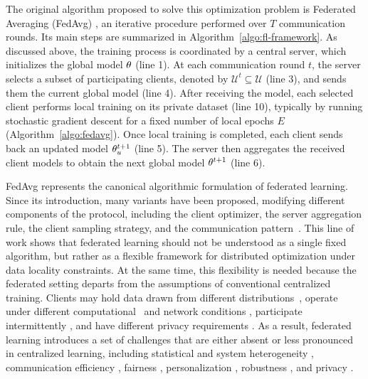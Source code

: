 The original algorithm proposed to solve this optimization problem is Federated Averaging (FedAvg) \cite[Algorithm~1]{pmlr-v54-mcmahan17a}, an iterative procedure performed over $T$ communication rounds. Its main steps are summarized in Algorithm~\ref{algo:fl-framework}. As discussed above, the training process is coordinated by a central server, which initializes the global model $\theta$ (line 1). At each communication round $t$, the server selects a subset of participating clients, denoted by $\mathcal{U}^t \subseteq \mathcal{U}$ (line 3), and sends them the current global model (line 4). After receiving the model, each selected client performs local training on its private dataset (line 10), typically by running stochastic gradient descent for a fixed number of local epochs $E$ (Algorithm~\ref{algo:fedavg}). Once local training is completed, each client sends back an updated model $\theta_u^{t+1}$ (line 5). The server then aggregates the received client models to obtain the next global model $\theta^{t+1}$ (line 6).

FedAvg represents the canonical algorithmic formulation of federated learning. Since its introduction, many variants have been proposed, modifying different components of the protocol, including the client optimizer, the server aggregation rule, the client sampling strategy, and the communication pattern~\cite{reddi2021adaptivefederatedoptimization}. This line of work shows that federated learning should not be understood as a single fixed algorithm, but rather as a flexible framework for distributed optimization under data locality constraints. At the same time, this flexibility is needed because the federated setting departs from the assumptions of conventional centralized training. Clients may hold data drawn from different distributions~\cite{Li2020On, marfoq2021federated, wang_client, scaffold}, operate under different computational~\cite{li2019fedmdheterogenousfederatedlearning,FjORD} and network conditions \cite{caldas2019expandingreachfederatedlearning, chen_efficient, ALMANIFI2023100742}, participate intermittently \cite{ribeiro_client_corr, rodio_clients, sun_participation}, and have different privacy requirements \cite{brendan2018learning, Fu_dp_dl_review}. As a result, federated learning introduces a set of challenges that are either absent or less pronounced in centralized learning, including statistical and system heterogeneity \cite{ye_review_het_fl}, communication efficiency \cite{ALMANIFI2023100742}, fairness \cite{Vucinich_fairness, Shi_fairness}, personalization \cite{tan_personalization}, robustness \cite{Uddin_robustness}, and privacy \cite{fu_privacy}.

